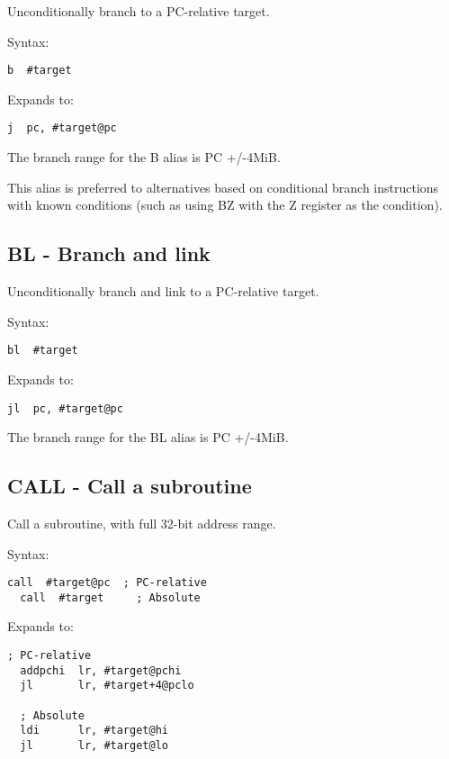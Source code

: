 Unconditionally branch to a PC-relative target.

Syntax:
\begin{lstlisting}[style=assembler]
  b  #target
\end{lstlisting}

Expands to:
\begin{lstlisting}[style=assembler]
  j  pc, #target@pc
\end{lstlisting}

\begin{notebox}
The branch range for the B alias is PC +/-4MiB.

This alias is preferred to alternatives based on conditional branch
instructions with known conditions (such as using BZ with the Z register as the
condition).
\end{notebox}

\subsection{BL - Branch and link}
\label{insn:BL}

Unconditionally branch and link to a PC-relative target.

Syntax:
\begin{lstlisting}[style=assembler]
  bl  #target
\end{lstlisting}

Expands to:
\begin{lstlisting}[style=assembler]
  jl  pc, #target@pc
\end{lstlisting}

\begin{notebox}
The branch range for the BL alias is PC +/-4MiB.
\end{notebox}

\subsection{CALL - Call a subroutine}
\label{insn:CALL}

Call a subroutine, with full 32-bit address range.

Syntax:
\begin{lstlisting}[style=assembler]
  call  #target@pc  ; PC-relative
  call  #target     ; Absolute
\end{lstlisting}

Expands to:
\begin{lstlisting}[style=assembler]
  ; PC-relative
  addpchi  lr, #target@pchi
  jl       lr, #target+4@pclo

  ; Absolute
  ldi      lr, #target@hi
  jl       lr, #target@lo
\end{lstlisting}

